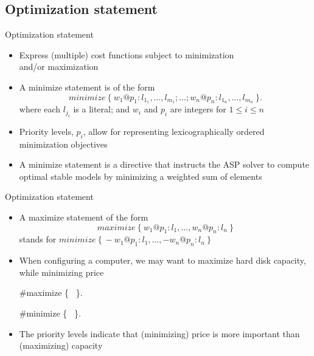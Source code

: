 \subsection{Optimization statement}
\begin{frame}{Optimization statement}
  \label{eq:minimize}
  \begin{itemize}
  \item {} Express (multiple) cost functions subject to minimization\\ and/or maximization
  \item {} A \alert{minimize statement} is of the form
    \[
    \mathit{minimize}~\{\ {w_1@p_1}\mathbin{:}{ l_{1_1},\dots, l_{m_1}};
                          \dots;
                          {w_n@p_n}\mathbin{:}{ l_{1_n},\dots, l_{m_n}}\ \}.
    \]
    where each $l_{j_i}$ is a literal;
    and $w_i$ and $p_i$ are integers for $1\leq i\leq n$
    \smallskip
  \item<2-> [] Priority levels, $p_i$, allow for representing lexicographically ordered minimization objectives
    \smallskip
  \item<3->  A minimize statement is a directive that instructs the ASP solver to
    compute optimal stable models by minimizing a weighted sum of elements
  \end{itemize}
\end{frame}
\begin{frame}[fragile]{Optimization statement}
  \begin{itemize}
  \item<1-> A maximize statement of the form
    \[
    \mathit{maximize}~\{\ w_1@p_1:l_1,\dots,w_n@p_n:l_n\ \}
    \]
    stands for
    \(
    \mathit{minimize}~\{\ {-}w_1@p_1:l_1,\dots,{-}w_n@p_n:l_n\ \}
    \)
    \medskip
  \item<2-> 
    When configuring a computer, we may want to maximize hard disk capacity,
    while minimizing price

\parbox{\linewidth}{\footnotesize%
\begin{semiverbatim}
  \#maximize \{\  \}.

  \#minimize \{\  \}.
\end{semiverbatim}}

  \item<2-> [] The priority levels indicate that (minimizing) price is more important than (maximizing) capacity
  \end{itemize}
\end{frame}
